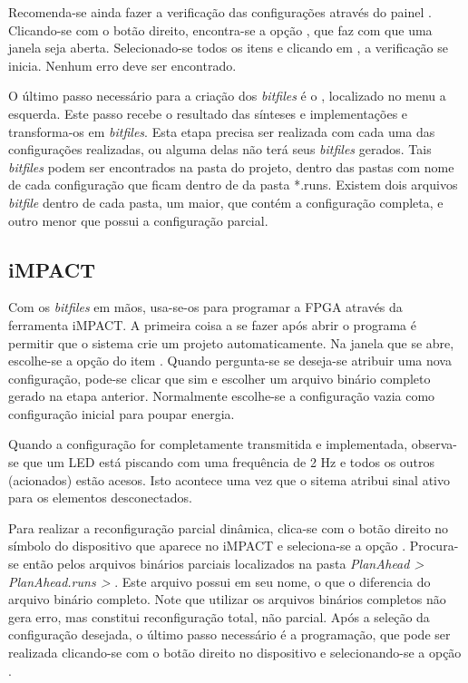 \documentclass[11pt,a4paper,oneside]{book}
\begin{document}
Recomenda-se ainda fazer a verificação das configurações através do painel .
Clicando-se com o botão direito, encontra-se a opção , que faz com que uma janela seja aberta.
Selecionado-se todos os itens e clicando em , a verificação se inicia.
Nenhum erro deve ser encontrado.

O último passo necessário para a criação dos \textit{bitfiles} é o , localizado no menu a esquerda.
Este passo recebe o resultado das sínteses e implementações e transforma-os em \textit{bitfiles}.
Esta etapa precisa ser realizada com cada uma das configurações realizadas, ou alguma delas não terá seus \textit{bitfiles} gerados.
Tais \textit{bitfiles} podem ser encontrados na pasta do projeto, dentro das pastas com nome de cada configuração que ficam dentro de da pasta *.runs.
Existem dois arquivos \textit{bitfile} dentro de cada pasta, um maior, que contém a configuração completa, e outro menor que possui a configuração parcial.

\subsection{iMPACT}
Com os \textit{bitfiles} em mãos, usa-se-os para programar a FPGA através da ferramenta iMPACT. 
A primeira coisa a se fazer após abrir o programa é permitir que o sistema crie um projeto automaticamente.
Na janela que se abre, escolhe-se a opção  do item .
Quando pergunta-se se deseja-se atribuir uma nova configuração, pode-se clicar que sim e escolher um arquivo binário completo gerado na etapa anterior.
Normalmente escolhe-se a configuração vazia como configuração inicial para poupar energia.

Quando a configuração for completamente transmitida e implementada, observa-se que um LED está piscando com uma frequência de 2 Hz e todos os outros (acionados) estão acesos.
Isto acontece uma vez que o sitema atribui sinal ativo para os elementos desconectados.

Para realizar a reconfiguração parcial dinâmica, clica-se com o botão direito no símbolo do dispositivo que aparece no iMPACT e seleciona-se a opção .
Procura-se então pelos arquivos binários parciais localizados na pasta \textit{PlanAhead > PlanAhead.runs >} .
Este arquivo possui  em seu nome, o que o diferencia do arquivo binário completo.
Note que utilizar os arquivos binários completos não gera erro, mas constitui reconfiguração total, não parcial.
Após a seleção da configuração desejada, o último passo necessário é a programação, que pode ser realizada clicando-se com o botão direito no dispositivo e selecionando-se a opção .
\end{document}
